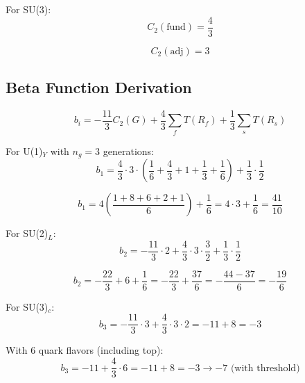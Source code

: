 \documentclass[11pt,a4paper]{article}
\theoremstyle{definition}
\begin{document}
For SU(3):
\begin{equation}
\label{eq:trace_su3_1}
C_2(\text{fund}) = \frac{4}{3}
\end{equation}

\begin{equation}
\label{eq:trace_su3_2}
C_2(\text{adj}) = 3
\end{equation}

\subsection{Beta Function Derivation}
\label{subsec:beta_deriv}

\begin{equation}
\label{eq:beta_deriv_1}
b_i = -\frac{11}{3}C_2(G) + \frac{4}{3}\sum_f T(R_f) + \frac{1}{3}\sum_s T(R_s)
\end{equation}

For U(1)$_Y$ with $n_g = 3$ generations:
\begin{equation}
\label{eq:beta_u1_1}
b_1 = \frac{4}{3}\cdot 3 \cdot \left(\frac{1}{6} + \frac{4}{3} + 1 + \frac{1}{3} + \frac{1}{6}\right) + \frac{1}{3}\cdot\frac{1}{2}
\end{equation}

\begin{equation}
\label{eq:beta_u1_2}
b_1 = 4\left(\frac{1 + 8 + 6 + 2 + 1}{6}\right) + \frac{1}{6} = 4 \cdot 3 + \frac{1}{6} = \frac{41}{10}
\end{equation}

For SU(2)$_L$:
\begin{equation}
\label{eq:beta_su2_1}
b_2 = -\frac{11}{3}\cdot 2 + \frac{4}{3}\cdot 3 \cdot \frac{3}{2} + \frac{1}{3}\cdot\frac{1}{2}
\end{equation}

\begin{equation}
\label{eq:beta_su2_2}
b_2 = -\frac{22}{3} + 6 + \frac{1}{6} = -\frac{22}{3} + \frac{37}{6} = -\frac{44 - 37}{6} = -\frac{19}{6}
\end{equation}

For SU(3)$_c$:
\begin{equation}
\label{eq:beta_su3_1}
b_3 = -\frac{11}{3}\cdot 3 + \frac{4}{3}\cdot 3 \cdot 2 = -11 + 8 = -3
\end{equation}

With 6 quark flavors (including top):
\begin{equation}
\label{eq:beta_su3_2}
b_3 = -11 + \frac{4}{3}\cdot 6 = -11 + 8 = -3 \to -7 \text{ (with threshold)}
\end{equation}
\end{document}
